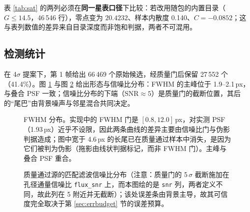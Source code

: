 \documentclass[11pt,a4paper]{ctexart}
\begin{document}
\noindent 表 \ref{tab:sat} 的两列必须在\textbf{同一星表口径}下比较：若改用随包的内置目录（$G\le14.5$，46\,546 行），零点变为 $20.4232$、样本内散度 0.140、$C=-0.0852$；这与表列数值的差异来自目录深度而非饱和判据，两者不可混用。

\subsection{检测统计}
在 4$\sigma$ 提案下，第 1 帧给出 66\,469 个原始候选，经质量门后保留 27\,552 个（41.4\%）。图 \ref{fig:fwhm} 与图 \ref{fig:snr} 给出形态与信噪比分布：FWHM 的主峰位于 1.9--2.1\,px，与叠合 PSF 一致；信噪比分布的下端（$\mathrm{SNR}\approx5$）是质量门的截断位置，其后的“尾巴”由背景噪声与邻星混合共同决定。

\begin{figure}[htbp]\centering
{}
\caption{FWHM 分布。实现中的 FWHM 门是 $[0.8,12.0]$\,px，对实测 PSF（1.93\,px）近乎不设限，因此两条曲线的差异主要由信噪比门与伪影判据造成；图中宽于 4.6\,px 的长尾已在质量通过样本中消失，是因为它们被判为伪影（拖影由线状判据标记，而非 FWHM 门）。主峰与叠合 PSF 重合。}
\label{fig:fwhm}
\end{figure}

\begin{figure}[htbp]\centering
{}
\caption{质量通过源的匹配滤波信噪比分布（注意：质量门的 5\,$\sigma$ 截断施加在孔径通量信噪比 \texttt{flux\_snr} 上，而本图绘的是 \texttt{snr} 列，两者定义不同，故此列在 5 附近并无截断）；该处误差条由背景主导，故其可信度完全取决于第 \ref{sec:errbudget} 节的误差预算。}
\label{fig:snr}
\end{figure}
\end{document}
